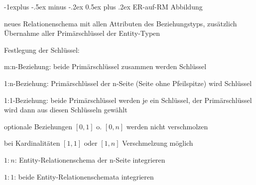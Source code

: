 \documentclass[a4paper]{article}
\makeatletter
\renewcommand{\subsection}{\@startsection{subsection}{2}{0mm}%
                                {-1explus -.5ex minus -.2ex}%
                                {0.5ex plus .2ex}%
                                {\normalfont\normalsize\bfseries}}
\makeatother
\begin{document}
\begin{multicols}{3}
    \subsection{ER-auf-RM Abbildung}
    \begin{itemize*}
        \item neues Relationenschema mit allen Attributen des Beziehungstyps, zusätzlich Übernahme aller Primärschlüssel der Entity-Typen
        \item Festlegung der Schlüssel:
        \begin{itemize*}
            \item m:n-Beziehung: beide Primärschlüssel zusammen werden Schlüssel
            \item 1:n-Beziehung: Primärschlüssel der n-Seite (Seite ohne Pfeilspitze) wird Schlüssel
            \item 1:1-Beziehung: beide Primärschlüssel werden je ein Schlüssel, der Primärschlüssel wird dann aus diesen Schlüsseln gewählt
        \end{itemize*}
        \item optionale Beziehungen $[0,1]$ o. $[0,n]$ werden nicht verschmolzen
        \item bei Kardinalitäten $[1,1]$ oder $[1,n]$ Verschmelzung möglich
        \begin{itemize*}
            \item $1:n$: Entity-Relationenschema der n-Seite integrieren
            \item $1:1$: beide Entity-Relationenschemata integrieren
        \end{itemize*}
    \end{itemize*}


\end{multicols}
\end{document}
